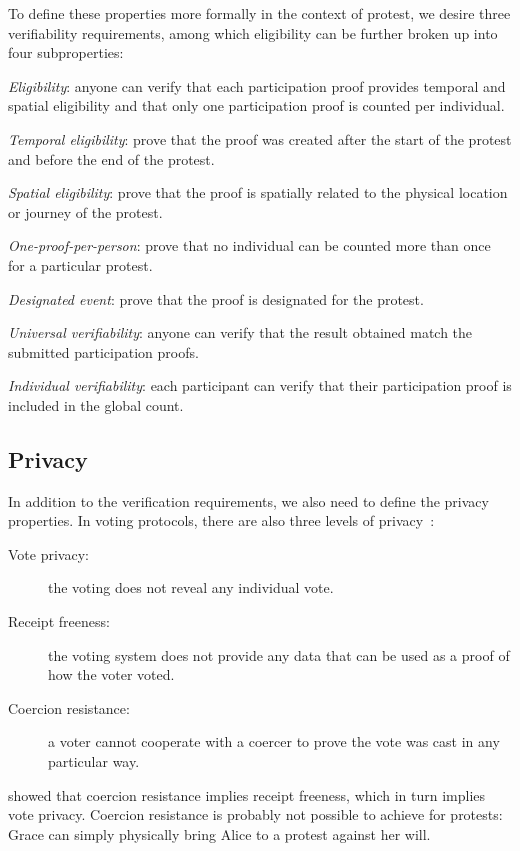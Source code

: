 To define these properties more formally in the context of protest, we desire 
three verifiability requirements, among which eligibility can be further broken 
up into four subproperties:
\begin{requirements}[V]
  \item\label{EligibilityVerif} \emph{Eligibility}:
    anyone can verify that each participation proof provides temporal and 
    spatial eligibility and that only one participation proof is counted per 
    individual.
    \begin{requirements}
    \item\label{TemporallyRelated} \emph{Temporal eligibility}:
      prove that the proof was created after the start of the protest and
      before the end of the protest.
    \item\label{SpatiallyRelated} \emph{Spatial eligibility}:
      prove that the proof is spatially related to the physical location or 
      journey of the protest.
    \item\label{CountOnce} \emph{One-proof-per-person}:
      prove that no individual can be counted more than once for a particular 
      protest.
    \item\label{DesignatedEvent} \emph{Designated event}:
      prove that the proof is designated for the protest.
    \end{requirements}

  \item\label{UniversalVerif} \emph{Universal verifiability}:
    anyone can verify that the result obtained match the submitted participation 
    proofs.

  \item\label{IndividualVerif} \emph{Individual verifiability}:
    each participant can verify that their participation proof is included in 
    the global count.
\end{requirements}

\subsection{Privacy}%
\label{Privacy}

In addition to the verification requirements, we also need to define the 
privacy properties.
In voting protocols, there are also three levels of 
privacy~\cite{VerifyingPrivacyPropertiesOfVotingProtocols}:
\begin{description}
\item[Vote privacy:] the voting does not reveal any individual vote.
\item[Receipt freeness:] the voting system does not provide any data that can 
  be used as a proof of how the voter voted.
\item[Coercion resistance:] a voter cannot cooperate with a coercer to prove the 
  vote was cast in any particular way.
\end{description}
 showed that coercion 
resistance implies receipt freeness, which in turn implies vote privacy.
Coercion resistance is probably not possible to achieve for protests:
\eg Grace can simply physically bring Alice to a protest against her will.

